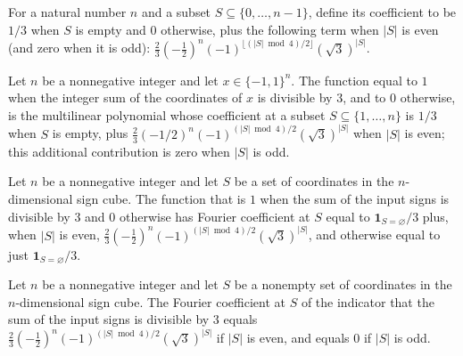 \begin{definition}
\label{FABL.modThreeFourierCoefficient}
\leanok
For a natural number $n$ and a subset $S\subseteq\{0,\ldots,n-1\}$, define its
coefficient to be $1/3$ when $S$ is empty and $0$ otherwise, plus the following term
when $|S|$ is even (and zero when it is odd):
$\frac{2}{3}(-\frac12)^n(-1)^{\lfloor(|S|\bmod 4)/2\rfloor}(\sqrt{3})^{|S|}$.
\end{definition}

\begin{theorem}
\label{FABL.modThree_eq_multilinearPolynomial}
\leanok
{}
Let $n$ be a nonnegative integer and let $x\in\{-1,1\}^n$. The function equal to $1$
when the integer sum of the coordinates of $x$ is divisible by $3$, and to $0$
otherwise, is the multilinear polynomial whose coefficient at a subset
$S\subseteq\{1,\ldots,n\}$ is $1/3$ when $S$ is empty, plus
$\frac{2}{3}(-1/2)^n(-1)^{(|S|\bmod 4)/2}(\sqrt{3})^{|S|}$ when $|S|$ is even; this
additional contribution is zero when $|S|$ is odd.
\end{theorem}

\begin{theorem}
\label{FABL.fourierCoeff_modThree}
\leanok
{}
Let $n$ be a nonnegative integer and let $S$ be a set of coordinates in the
$n$-dimensional sign cube. The function that is $1$ when the sum of the input signs is
divisible by $3$ and $0$ otherwise has Fourier coefficient at $S$ equal to
$\mathbf{1}_{S=\varnothing}/3$ plus, when $|S|$ is even,
$\frac{2}{3}(-\frac12)^n(-1)^{(|S|\bmod 4)/2}(\sqrt{3})^{|S|}$, and otherwise equal to
just $\mathbf{1}_{S=\varnothing}/3$.
\end{theorem}

\begin{theorem}
\label{FABL.fourierCoeff_modThree_of_nonempty}
\leanok
{}
Let $n$ be a nonnegative integer and let $S$ be a nonempty set of coordinates in the
$n$-dimensional sign cube. The Fourier coefficient at $S$ of the indicator that the sum
of the input signs is divisible by $3$ equals $\frac{2}{3}(-\frac12)^n(-1)^{(|S|\bmod
4)/2}(\sqrt{3})^{|S|}$ if $|S|$ is even, and equals $0$ if $|S|$ is odd.
\end{theorem}

